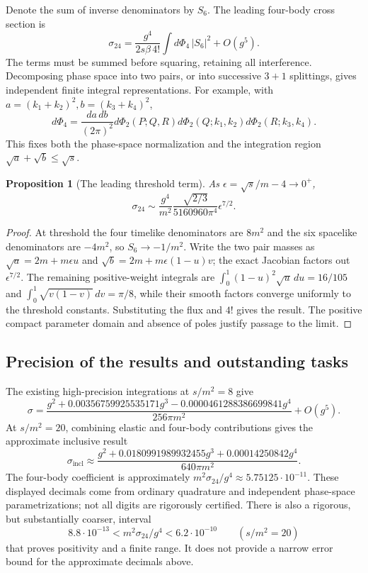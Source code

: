\documentclass[11pt,a4paper,oneside]{article}
\theoremstyle{plain}
\newtheorem{proposition}[theorem]{Proposition}
\theoremstyle{definition}
\theoremstyle{remark}
\numberwithin{equation}{section}
\begin{document}
Denote the sum of inverse denominators by $S_6$. The leading four-body cross section is
\begin{equation}
 \sigma_{24}=\frac{g^4}{2s\beta\,4!}\int d\Phi_4\,|S_6|^2+O(g^5).
\end{equation}
The terms must be summed before squaring, retaining all interference. Decomposing phase space into two pairs, or into successive $3+1$ splittings, gives independent finite integral representations. For example, with $a=(k_1+k_2)^2,b=(k_3+k_4)^2$,
\begin{equation}
 d\Phi_4=\frac{da\,db}{(2\pi)^2}
 d\Phi_2(P;Q,R)d\Phi_2(Q;k_1,k_2)d\Phi_2(R;k_3,k_4).
\end{equation}
This fixes both the phase-space normalization and the integration region $\sqrt a+\sqrt b\le\sqrt s$.

\begin{proposition}[The leading threshold term]
As $\epsilon=\sqrt s/m-4\to0^+$,
\begin{equation}
 \sigma_{24}\sim\frac{g^4}{m^2}
 \frac{\sqrt{2/3}}{5160960\pi^4}\epsilon^{7/2}.
\end{equation}
\end{proposition}
\begin{proof}
At threshold the four timelike denominators are $8m^2$ and the six spacelike denominators are $-4m^2$, so $S_6\to-1/m^2$. Write the two pair masses as $\sqrt a=2m+m\epsilon u$ and $\sqrt b=2m+m\epsilon(1-u)v$; the exact Jacobian factors out $\epsilon^{7/2}$. The remaining positive-weight integrals are $\int_0^1(1-u)^2\sqrt u\,du=16/105$ and $\int_0^1\sqrt{v(1-v)}\,dv=\pi/8$, while their smooth factors converge uniformly to the threshold constants. Substituting the flux and $4!$ gives the result. The positive compact parameter domain and absence of poles justify passage to the limit.
\end{proof}


\subsection{Precision of the results and outstanding tasks}
The existing high-precision integrations at $s/m^2=8$ give
\begin{equation}
 \sigma=\frac{g^2+0.00356759925535171g^3
 -0.0000461288386699841g^4}{256\pi m^2}+O(g^5).
\end{equation}
At $s/m^2=20$, combining elastic and four-body contributions gives the approximate inclusive result
\begin{equation}
 \sigma_{\mathrm{incl}}\approx
 \frac{g^2+0.0180991989932455g^3+0.00014250842g^4}{640\pi m^2}.
\end{equation}
The four-body coefficient is approximately $m^2\sigma_{24}/g^4\approx5.75125\cdot10^{-11}$. These displayed decimals come from ordinary quadrature and independent phase-space parametrizations; not all digits are rigorously certified. There is also a rigorous, but substantially coarser, interval
\begin{equation}
 8.8\cdot10^{-13}<m^2\sigma_{24}/g^4<6.2\cdot10^{-10}
 \qquad(s/m^2=20)
\end{equation}
that proves positivity and a finite range. It does not provide a narrow error bound for the approximate decimals above.
\end{document}
